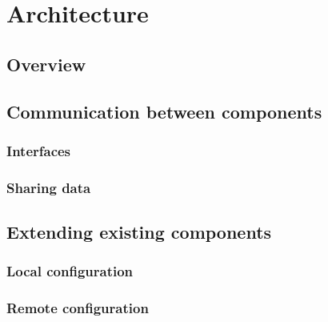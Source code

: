\chapter{Architecture}
\section{Overview}
\section{Communication between components}
\subsection{Interfaces}
\subsection{Sharing data}
\section{Extending existing components}
\subsection{Local configuration}
\subsection{Remote configuration}

